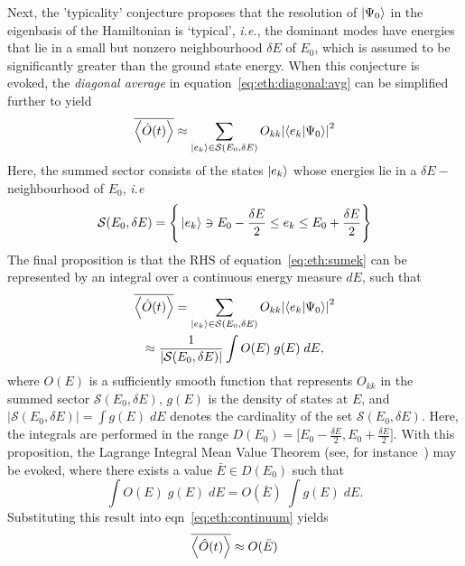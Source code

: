 \documentclass[%
reprint,
superscriptaddress,
amsmath,amssymb,
aps,
prb,
]{revtex4-2}
\begin{document}
	Next, the 'typicality' conjecture proposes that  the resolution of $\ket{\Psi_0}$ in the eigenbasis of the Hamiltonian is `typical', \textit{i.e.}, the dominant modes have energies that lie in a small but nonzero neighbourhood $\delta E$ of $E_0$, which is assumed to be  significantly greater than the ground state energy. When this conjecture is evoked, the \textit{diagonal average} in equation~\ref{eq:eth:diagonal:avg} can be simplified further to yield
	\begin{equation}
		\label{eq:eth:sumek}
		\overline{\ev{\hat{O}(t)}} \approx \sum_{\ket{e_k}\in \mathcal{S}(E_0, \delta E)}O_{kk}\abs{\ip{e_k}{\Psi_0}}^2
	\end{equation}
Here, the summed sector consists of the states $\ket{e_k}$ whose energies lie in a $\delta E-$neighbourhood of $E_0$, \textit{i.e} 
\begin{equation*}
	\mathcal{S}(E_0, \delta E) = \Bigg\{\ket{e_k}\ni E_0-\frac{\delta E}{2}\leq e_k \leq E_0+\frac{\delta E}{2}\Bigg\}
\end{equation*}
The final proposition is that the RHS of equation~\ref{eq:eth:sumek} can be represented by an integral over a continuous energy measure $dE$, such that
\begin{multline}
\overline{\expval{\hat{O}(t)}} = \sum_{\ket{e_k}\in \mathcal{S}(E_0, \delta E)}O_{kk}\abs{\ip{e_k}{\Psi_0}}^2\\
 \approx \frac{1}{\left\vert\mathcal{S}(E_0, \delta E) \right\vert} \int O(E)\; g(E)\;dE,
 \label{eq:eth:continuum}
\end{multline} 
where $O(E)$ is a sufficiently smooth function that represents $O_{kk}$ in the summed sector $\mathcal{S}(E_0, \delta E)$, $g(E)$ is the density of states at $E$, and $\vert\mathcal{S}(E_0, \delta E) \vert = \displaystyle\int g(E)\;dE$ denotes the cardinality of the set $\mathcal{S}(E_0, \delta E)$. Here, the integrals are performed in the range $D(E_0)=\big[{E_0 - \frac{\delta E}{2}}, {E_0+\frac{\delta E}{2}}\big]$. With this proposition, the Lagrange Integral Mean Value Theorem (see, for instance~\cite{hobson_e_w_1909_1447800}) may be evoked, where there exists a value $\bar{E}\in D(E_0)$ such that
\begin{equation*}
\int O(E)\; g(E)\;dE = O(\bar{E})\; \int g(E)\;dE.
\end{equation*}
Substituting this result into eqn~\ref{eq:eth:continuum} yields
      \begin{equation}
		\label{eq:eth:final}
		\overline{\ev{\hat{O}(t)}} \approx  O(\bar{E})
	\end{equation}
\end{document}
